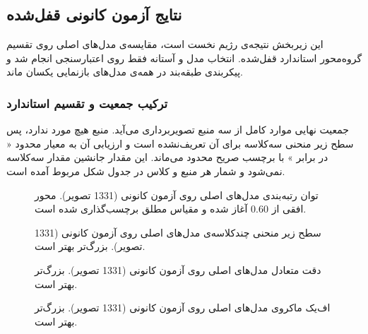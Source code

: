\subsection{نتایج آزمون کانونی قفل‌شده}

این زیربخش نتیجه‌ی رژیم نخست است، مقایسه‌ی مدل‌های اصلی روی تقسیم گروه‌محور استاندارد قفل‌شده. انتخاب مدل و آستانه فقط روی اعتبارسنجی انجام شد و پیکربندی طبقه‌بند در همه‌ی مدل‌های بازنمایی یکسان ماند.

\subsubsection{ترکیب جمعیت و تقسیم استاندارد}

جمعیت نهایی موارد کامل از سه منبع تصویربرداری می‌آید. منبع  هیچ مورد  ندارد، پس سطح زیر منحنی سه‌کلاسه برای آن تعریف‌نشده است و ارزیابی آن به معیار محدود « در برابر » با برچسب صریح محدود می‌ماند. این مقدار جانشین مقدار سه‌کلاسه نمی‌شود و شمار هر منبع و کلاس در جدول شکل مربوط آمده است.



\begin{figure}[htbp]
  \centering
  \caption{توان رتبه‌بندی مدل‌های اصلی روی آزمون کانونی (1331 تصویر). محور افقی از 0.60 آغاز شده و مقیاس مطلق برچسب‌گذاری شده است.}
  \label{fig:U28}
\end{figure}

\begin{figure}[htbp]
  \centering
  \caption{سطح زیر منحنی چندکلاسه‌ی مدل‌های اصلی روی آزمون کانونی (1331 تصویر). بزرگ‌تر بهتر است.}
  \label{fig:U29}
\end{figure}

\begin{figure}[htbp]
  \centering
  \caption{دقت متعادل مدل‌های اصلی روی آزمون کانونی (1331 تصویر). بزرگ‌تر بهتر است.}
  \label{fig:U30}
\end{figure}

\begin{figure}[htbp]
  \centering
  \caption{اف‌یک ماکروی مدل‌های اصلی روی آزمون کانونی (1331 تصویر). بزرگ‌تر بهتر است.}
  \label{fig:U31}
\end{figure}

